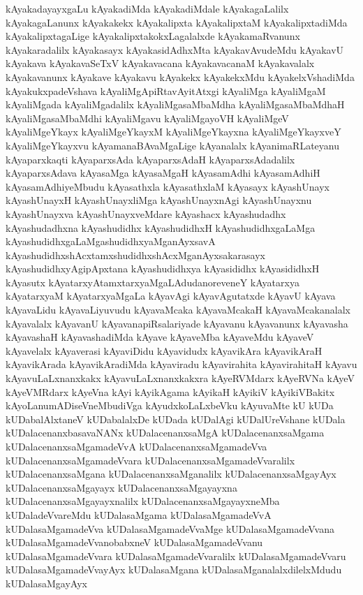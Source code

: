 {kAyakadayayxgaLu
kAyakadiMda
kAyakadiMdale
kAyakagaLalilx
kAyakagaLanunx
kAyakakekx
kAyakalipxta
kAyakalipxtaM
kAyakalipxtadiMda
kAyakalipxtagaLige
kAyakalipxtakokxLagalalxde
kAyakamaRvanunx
kAyakaradalilx
kAyakasayx
kAyakasidAdhxMta
kAyakavAvudeMdu
kAyakavU
kAyakava
kAyakavaSeTxV
kAyakavacana
kAyakavacanaM
kAyakavalalx
kAyakavanunx
kAyakave
kAyakavu
kAyakekx
kAyakekxMdu
kAyakelxVshadiMda
kAyakukxpadeVshava
kAyaliMgApiRtavAyitAtxgi
kAyaliMga
kAyaliMgaM
kAyaliMgada
kAyaliMgadalilx
kAyaliMgasaMbaMdha
kAyaliMgasaMbaMdhaH
kAyaliMgasaMbaMdhi
kAyaliMgavu
kAyaliMgayoVH
kAyaliMgeV
kAyaliMgeYkayx
kAyaliMgeYkayxM
kAyaliMgeYkayxna
kAyaliMgeYkayxveY
kAyaliMgeYkayxvu
kAyamanaBAvaMgaLige
kAyanalalx
kAyanimaRLateyanu
kAyaparxkaqti
kAyaparxsAda
kAyaparxsAdaH
kAyaparxsAdadalilx
kAyaparxsAdava
kAyasaMga
kAyasaMgaH
kAyasamAdhi
kAyasamAdhiH
kAyasamAdhiyeMbudu
kAyasathxla
kAyasathxlaM
kAyasayx
kAyashUnayx
kAyashUnayxH
kAyashUnayxliMga
kAyashUnayxnAgi
kAyashUnayxnu
kAyashUnayxva
kAyashUnayxveMdare
kAyashacx
kAyashudadhx
kAyashudadhxna
kAyashudidhx
kAyashudidhxH
kAyashudidhxgaLaMga
kAyashudidhxgaLaMgashudidhxyaMganAyxsavA
kAyashudidhxshAcxtamxshudidhxshAcxMganAyxsakarasayx
kAyashudidhxyAgipApxtana
kAyashudidhxya
kAyasididhx
kAyasididhxH
kAyasutx
kAyatarxyAtamxtarxyaMgaLAdudanoreveneY
kAyatarxya
kAyatarxyaM
kAyatarxyaMgaLa
kAyavAgi
kAyavAgutatxde
kAyavU
kAyava
kAyavaLidu
kAyavaLiyuvudu
kAyavaMcaka
kAyavaMcakaH
kAyavaMcakanalalx
kAyavalalx
kAyavanU
kAyavanapiRsalariyade
kAyavanu
kAyavanunx
kAyavasha
kAyavashaH
kAyavashadiMda
kAyave
kAyaveMba
kAyaveMdu
kAyaveV
kAyavelalx
kAyaverasi
kAyaviDidu
kAyavidudx
kAyavikAra
kAyavikAraH
kAyavikArada
kAyavikAradiMda
kAyaviradu
kAyavirahita
kAyavirahitaH
kAyavu
kAyavuLaLxnanxkakx
kAyavuLaLxnanxkakxra
kAyeRVMdarx
kAyeRVNa
kAyeV
kAyeVMRdarx
kAyeVna
kAyi
kAyikAgama
kAyikaH
kAyikiV
kAyikiVBakitx
kAyoLanumADiseVneMbudiVga
kAyudxkoLaLxbeVku
kAyuvaMte
kU
kUDa
kUDabalAlxtaneV
kUDabalalxDe
kUDada
kUDalAgi
kUDalUreVshane
kUDala
kUDalacenanxbasavaNANx
kUDalacenanxsaMgA
kUDalacenanxsaMgama
kUDalacenanxsaMgamadeVvA
kUDalacenanxsaMgamadeVva
kUDalacenanxsaMgamadeVvara
kUDalacenanxsaMgamadeVvaralilx
kUDalacenanxsaMgana
kUDalacenanxsaMganalilx
kUDalacenanxsaMgayAyx
kUDalacenanxsaMgayayx
kUDalacenanxsaMgayayxna
kUDalacenanxsaMgayayxnalilx
kUDalacenanxsaMgayayxneMba
kUDaladeVvareMdu
kUDalasaMgama
kUDalasaMgamadeVvA
kUDalasaMgamadeVva
kUDalasaMgamadeVvaMge
kUDalasaMgamadeVvana
kUDalasaMgamadeVvanobabxneV
kUDalasaMgamadeVvanu
kUDalasaMgamadeVvara
kUDalasaMgamadeVvaralilx
kUDalasaMgamadeVvaru
kUDalasaMgamadeVvayAyx
kUDalasaMgana
kUDalasaMganalalxdilelxMdudu
kUDalasaMgayAyx
}
